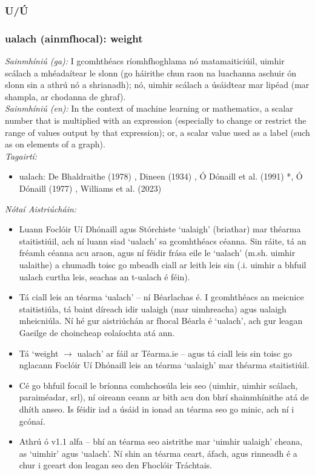  \subsubsection*{U/Ú}

\subsubsection*{ualach (ainmfhocal): weight}
 \noindent \textit{Sainmhíniú (ga):} I gcomhthéacs ríomhfhoghlama nó matamaiticiúil, uimhir scálach a mhéadaítear le slonn (go háirithe chun raon na luachanna aschuir ón slonn sin a athrú nó a shrianadh); nó, uimhir scálach a úsáidtear mar lipéad (mar shampla, ar chodanna de ghraf).
\\
 \noindent \textit{Sainmhíniú (en):} In the context of machine learning or mathematics, a scalar number that is multiplied with an expression (especially to change or restrict the range of values output by that expression); or, a scalar value used as a label (such as on elements of a graph).
\\
 \noindent \textit{Tagairtí:}
\begin{itemize}
	\item ualach: De Bhaldraithe (1978) \cite{de-bhaldraithe}, Dineen (1934) \cite{dineen}, Ó Dónaill et al. (1991) \cite{focloir-beag}*, Ó Dónaill (1977) \cite{odonaill}, Williams et al. (2023) \cite{storchiste}
\end{itemize}

 \noindent \textit{Nótaí Aistriúcháin:}
\begin{itemize}
	\item Luann Foclóir Uí Dhónaill agus Stórchiste `ualaigh' (briathar) mar théarma staitistiúil, ach ní luann siad `ualach' sa gcomhthéacs céanna. Sin ráite, tá an fréamh céanna acu araon, agus ní féidir frása eile le `ualach' (m.sh. uimhir ualaithe) a chumadh toisc go mbeadh ciall ar leith leis sin (.i. uimhir a bhfuil ualach curtha leis, seachas an t-ualach é féin).
	\item Tá ciall leis an téarma `ualach' -- ní Béarlachas é. I gcomhthéacs an meicnice staitistiúla, tá baint díreach idir ualaigh (mar uimhreacha) agus ualaigh mheicniúla. Ní hé gur aistriúchán ar fhocal Béarla é `ualach', ach gur leagan Gaeilge de choincheap eolaíochta atá ann.
	\item Tá `weight $\rightarrow$ ualach' ar fáil ar Téarma.ie -- agus tá ciall leis sin toisc go nglacann Foclóir Uí Dhónaill leis an téarma `ualaigh' mar théarma staitistiúil. 
	\item Cé go bhfuil focail le bríonna comhchosúla leis seo (uimhir, uimhir scálach, paraiméadar, srl), ní oireann ceann ar bith acu don bhrí shainmhínithe atá de dhíth anseo. Is féidir iad a úsáid in ionad an téarma seo go minic, ach ní i gcónaí.
	\item Athrú ó v1.1 alfa -- bhí an téarma seo aistrithe mar `uimhir ualaigh' cheana, as `uimhir' agus `ualach'. Ní shin an téarma ceart, áfach, agus rinneadh é a chur i gceart don leagan seo den Fhoclóir Tráchtais.
\end{itemize}


